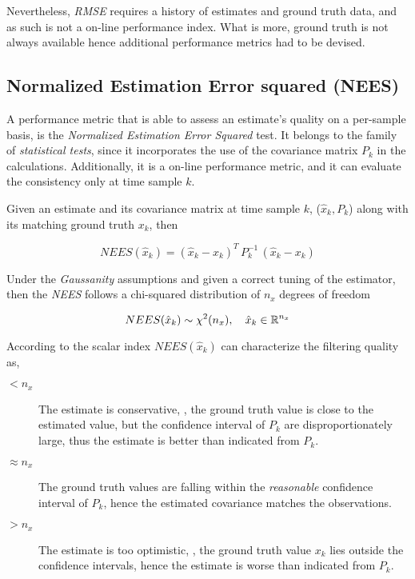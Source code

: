 Nevertheless, \emph{RMSE} requires a history of estimates and ground truth data, and as such is not a on-line performance index. What is more,  ground truth is not always available hence additional performance metrics had to be devised. 

\subsection{Normalized Estimation Error squared (NEES)}
\label{ssec:NEES}
A performance metric that is able to assess an estimate's quality on a per-sample basis, is the \emph{Normalized Estimation Error Squared} test. It belongs to the family of \emph{statistical tests}, since it incorporates the use of the covariance matrix $P_k$ in the calculations. Additionally, it is a on-line performance metric, and it can evaluate the consistency only at time sample $k$.

\begin{framed}
Given an estimate and its covariance matrix at time sample $k$, ($\hat{x}_k, P_k$) along with its matching ground truth $x_k$, then

\begin{equation}\label{eq:NEES}
NEES(\hat{x}_k) =  (\hat{x}_k - x_k)^T \, P_k^{-1} \, (\hat{x}_k - x_k) 
\end{equation}

\end{framed}

Under the \emph{Gaussanity} assumptions and given a correct tuning of the estimator, then the \emph{NEES} follows a chi-squared distribution of $n_x$  degrees of freedom

\begin{equation}\label{key}
NEES(\hat{x}_k) \sim \chi^2(n_x), \quad \hat{x}_k \in {\mathbb{R}}^{n_x}
\end{equation}

According to \cite{TargetTracking} the scalar index $NEES(\hat{x}_k)$ can characterize the filtering quality as,

\begin{description}
	\item[$< n_x$] The estimate is conservative, \ie, the ground truth value is close to the estimated value, but the confidence interval of $P_k$ are disproportionately large, thus the estimate is better than indicated from $P_k$.
	\item[$ \approx n_x $] The ground truth values are falling within the \emph{reasonable} confidence interval of $P_k$, hence the estimated covariance matches the observations.
	\item[$> n_x$] The estimate is too optimistic, \ie, the ground truth value $x_k$ lies outside the confidence intervals, hence the estimate is worse than indicated from $P_k$.
\end{description}
